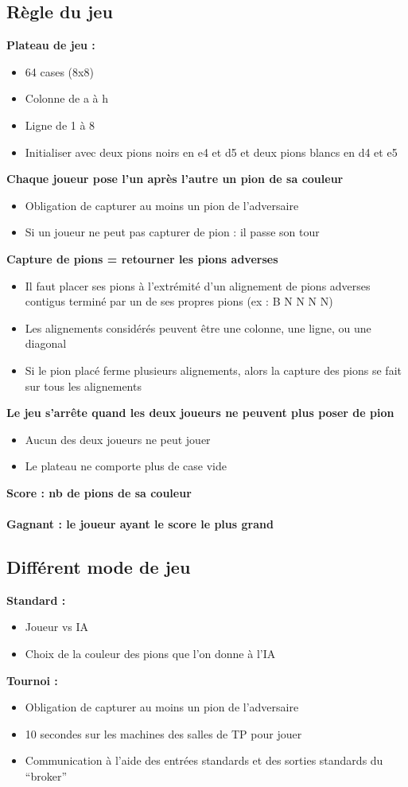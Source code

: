 \subsection{Règle du jeu}
    \textbf{Plateau de jeu :}
    \begin{itemize}
        \item 64 cases (8x8)
        \item Colonne de a à h
        \item Ligne de 1 à 8 
        \item Initialiser avec deux pions noirs en e4 et d5 et deux pions blancs en d4 et e5
    \end{itemize}
    \textbf{Chaque joueur pose l'un après l'autre un pion de sa couleur}
    \begin{itemize}
        \item Obligation de capturer au moins un pion de l’adversaire
        \item Si un joueur ne peut pas capturer de pion : il passe son tour
    \end{itemize}
    \textbf{Capture de pions = retourner les pions adverses}
    \begin{itemize}
        \item Il faut placer ses pions à l'extrémité d'un alignement de pions adverses contigus terminé par un de ses propres pions (ex : B N N N N)
        \item Les alignements considérés peuvent être une colonne, une ligne, ou une diagonal
        \item Si le pion placé ferme plusieurs alignements, alors la capture des pions se fait sur tous les alignements
    \end{itemize}
    \textbf{Le jeu s'arrête quand les deux joueurs ne peuvent plus poser de pion}
    \begin{itemize}
        \item Aucun des deux joueurs ne peut jouer
        \item Le plateau ne comporte plus de case vide
    \end{itemize}
    \textbf{Score : nb de pions de sa couleur} \\ \\
    \textbf{Gagnant : le joueur ayant le score le plus grand}

\subsection{Différent mode de jeu}
    \textbf{Standard :}
    \begin{itemize}
        \item Joueur vs IA
        \item Choix de la couleur des pions que l’on donne à l’IA
    \end{itemize}
    \textbf{Tournoi :}
    \begin{itemize}
        \item Obligation de capturer au moins un pion de l’adversaire
        \item 10 secondes sur les machines des salles de TP pour jouer
        \item Communication à l’aide des entrées standards et des sorties standards du “broker”
    \end{itemize}